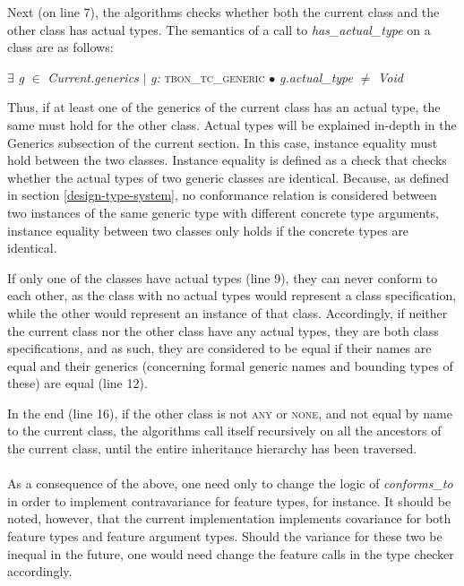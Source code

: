 Next (on line 7), the algorithms checks whether both the current class and the other class has actual types. The semantics of a call to \textit{has\_actual\_type} on a class are as follows:

{\footnotesize
\begin{center} 
$\exists$ \textit{g} $\in$ \textit{Current.generics} $\mid$ \textit{g:} \textsc{tbon\_tc\_generic} $\bullet$ \textit{g.actual\_type} $\neq$ \textit{Void}
\end{center}}

Thus, if at least one of the generics of the current class has an actual type, the same must hold for the other class. Actual types will be explained in-depth in the Generics subsection of the current section. In this case, instance equality must hold between the two classes. Instance equality is defined as a check that checks whether the actual types of two generic classes are identical. Because, as defined in section \ref{design-type-system}, no conformance relation is considered between two instances of the same generic type with different concrete type arguments, instance equality between two classes only holds if the concrete types are identical.

If only one of the classes have actual types (line 9), they can never conform to each other, as the class with no actual types would represent a class specification, while the other would represent an instance of that class. Accordingly, if neither the current class nor the other class have any actual types, they are both class specifications, and as such, they are considered to be equal if their names are equal and their generics (concerning formal generic names and bounding types of these) are equal (line 12).

In the end (line 16), if the other class is not \textsc{any} or \textsc{none}, and not equal by name to the current class, the algorithms call itself recursively on all the ancestors of the current class, until the entire inheritance hierarchy has been traversed. 
\paragraph{}
As a consequence of the above, one need only to change the logic of \textit{conforms\_to} in order to implement contravariance for feature types, for instance. It should be noted, however, that the current implementation implements covariance for both feature types and feature argument types. Should the variance for these two be inequal in the future, one would need change the feature calls in the type checker accordingly.

